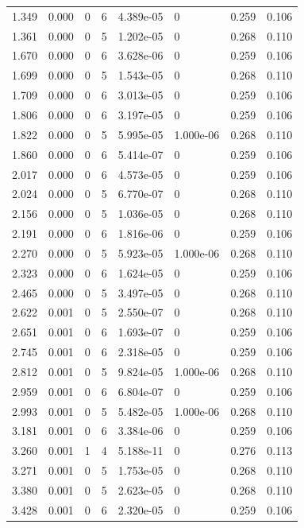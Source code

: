 \documentclass[preview]{standalone}
\begin{document}
{{\begin{tabular}{L{1.2cm}C{1.2cm} C{0.3cm}C{0.5cm} C{1.4cm}C{1.4cm} C{1.4cm}C{1.4cm}}
  1.349  &  0.000  & 0     &  6 &  4.389e-05  & 0  & 0.259 &  0.106   \\ 
  1.361  &  0.000  & 0     &  5 &  1.202e-05  & 0  & 0.268 &  0.110   \\ 
  1.670  &  0.000  & 0     &  6 &  3.628e-06  & 0  & 0.259 &  0.106   \\ 
  1.699  &  0.000  & 0     &  5 &  1.543e-05  & 0  & 0.268 &  0.110   \\ 
  1.709  &  0.000  & 0     &  6 &  3.013e-05  & 0  & 0.259 &  0.106   \\ 
  1.806  &  0.000  & 0     &  6 &  3.197e-05  & 0  & 0.259 &  0.106   \\ 
  1.822  &  0.000  & 0     &  5 &  5.995e-05  & 1.000e-06  & 0.268 &  0.110   \\ 
  1.860  &  0.000  & 0     &  6 &  5.414e-07  & 0  & 0.259 &  0.106   \\ 
  2.017  &  0.000  & 0     &  6 &  4.573e-05  & 0  & 0.259 &  0.106   \\ 
  2.024  &  0.000  & 0     &  5 &  6.770e-07  & 0  & 0.268 &  0.110   \\ 
  2.156  &  0.000  & 0     &  5 &  1.036e-05  & 0  & 0.268 &  0.110   \\ 
  2.191  &  0.000  & 0     &  6 &  1.816e-06  & 0  & 0.259 &  0.106   \\ 
  2.270  &  0.000  & 0     &  5 &  5.923e-05  & 1.000e-06  & 0.268 &  0.110   \\ 
  2.323  &  0.000  & 0     &  6 &  1.624e-05  & 0  & 0.259 &  0.106   \\ 
  2.465  &  0.000  & 0     &  5 &  3.497e-05  & 0  & 0.268 &  0.110   \\ 
  2.622  &  0.001  & 0     &  5 &  2.550e-07  & 0  & 0.268 &  0.110   \\ 
  2.651  &  0.001  & 0     &  6 &  1.693e-07  & 0  & 0.259 &  0.106   \\ 
  2.745  &  0.001  & 0     &  6 &  2.318e-05  & 0  & 0.259 &  0.106   \\ 
  2.812  &  0.001  & 0     &  5 &  9.824e-05  & 1.000e-06  & 0.268 &  0.110   \\ 
  2.959  &  0.001  & 0     &  6 &  6.804e-07  & 0  & 0.259 &  0.106   \\ 
  2.993  &  0.001  & 0     &  5 &  5.482e-05  & 1.000e-06  & 0.268 &  0.110   \\ 
  3.181  &  0.001  & 0     &  6 &  3.384e-06  & 0  & 0.259 &  0.106   \\ 
  3.260  &  0.001  & 1     &  4 &  5.188e-11  & 0  & 0.276 &  0.113   \\ 
  3.271  &  0.001  & 0     &  5 &  1.753e-05  & 0  & 0.268 &  0.110   \\ 
  3.380  &  0.001  & 0     &  5 &  2.623e-05  & 0  & 0.268 &  0.110   \\ 
  3.428  &  0.001  & 0     &  6 &  2.320e-05  & 0  & 0.259 &  0.106   \\ 
\hline 
\end{tabular} 

}}
\end{document}
